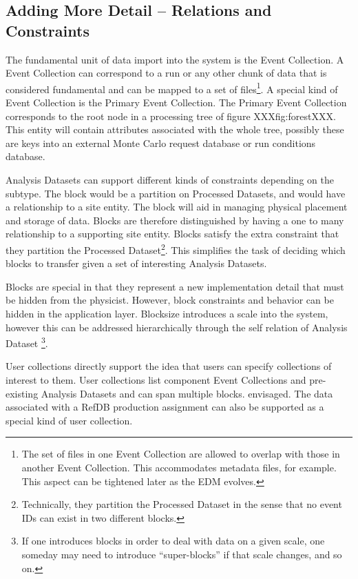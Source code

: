 \documentclass[pdftex]{cmspaper}
\begin{document}
{\subsection{Adding More Detail -- Relations and Constraints}

The fundamental unit of data import into the system is the Event
Collection.  A Event Collection can correspond to a run or any other
chunk of data that is considered fundamental and can be mapped to a set
of files\footnote{The set of files in one Event Collection are allowed
to overlap with those in another Event Collection.  This accommodates
metadata files, for example.  This aspect can be tightened later as the
EDM evolves.}.  A special kind of Event Collection is the Primary Event
Collection.  The Primary Event Collection corresponds to the root node in
a processing tree of figure XXXfig:forestXXX.  This entity will contain
attributes associated with the whole tree, possibly these are keys into
an external Monte Carlo request database or run conditions database.

Analysis Datasets can support different kinds of constraints depending
on the subtype.  The block would be a partition on Processed Datasets,
and would have a relationship to a site entity.  The block will
aid in managing physical placement and storage of data.  Blocks are
therefore distinguished by having a one to many relationship to a
supporting site entity.  Blocks satisfy the extra constraint that they
partition the Processed Dataset\footnote{Technically, they partition
the Processed Dataset in the sense that no event IDs can exist in two
different blocks.}.  This  simplifies the task of deciding which blocks
to transfer given a set of interesting Analysis Datasets.

Blocks are special in that they represent a new implementation detail
that must be hidden from the physicist.  However, block constraints and
behavior can be hidden in the application layer.  Blocksize introduces
a scale into the system,  however this can be addressed hierarchically
through the self relation of Analysis Dataset \footnote{If one introduces
blocks in order to deal with data on a given scale, one someday may need
to introduce ``super-blocks'' if that scale changes, and so on.}.

User collections directly support the idea that users can specify
collections of interest to them.  User collections list component Event
Collections and pre-existing Analysis Datasets and can span multiple
blocks.  envisaged.  The data associated with a RefDB production
assignment can also be supported as a special kind of user collection.

}
\end{document}
